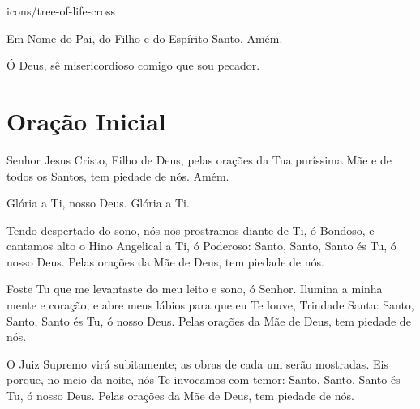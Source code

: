\documentclass{subfiles}
\begin{document}
\begin{chapterimg}[height=.9\textheight]{icons/tree-of-life-cross}
\end{chapterimg}

 
Em Nome do Pai, do Filho e do Espírito Santo. Amém. 
 
 
Ó Deus, sê misericordioso comigo que sou pecador. 

\section*{Oração Inicial}

Senhor Jesus Cristo, Filho de Deus, pelas orações da Tua puríssima Mãe 
e de todos os Santos, tem piedade de nós. Amém. 
 
Glória a Ti, nosso Deus. Glória a Ti. 
 
\comforter{}
 
\trisagion{} \thrice{}

\Doxology{}

\holytrinity{}
 
\mercy{} \thrice{}

\Doxology{}
 
\ourFather{}


Tendo despertado do sono, nós nos prostramos diante de Ti, ó 
Bondoso, e cantamos alto o Hino Angelical a Ti, ó Poderoso: Santo, Santo, Santo 
és Tu, ó nosso Deus. Pelas orações da Mãe de Deus, tem piedade de nós. 
 
\doxology{}

Foste Tu que me levantaste do meu leito e sono, ó Senhor. Ilumina a minha mente
e coração, e abre meus lábios para que eu Te louve, Trindade Santa: Santo, Santo,
Santo és Tu, ó nosso Deus. Pelas orações da Mãe de Deus, tem piedade de nós. 
 
\nowandever{}

O Juiz Supremo virá subitamente; as obras de cada um serão mostradas. Eis
porque, no meio da noite, nós Te invocamos com temor: Santo, Santo, Santo és Tu,
ó nosso Deus. Pelas orações da Mãe de Deus, tem piedade de nós.
\end{document}

